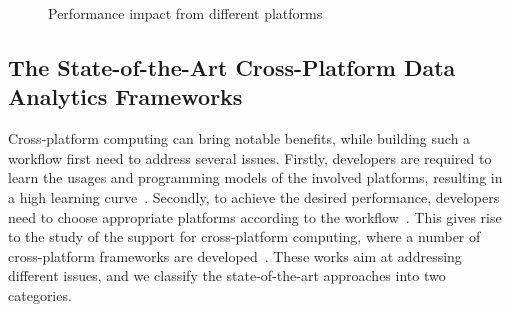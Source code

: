 \begin{figure}
  \centering
  
  \caption{Performance impact from different platforms}
  \label{fig:hetero}
\end{figure}

\subsection{The State-of-the-Art Cross-Platform Data Analytics Frameworks}

Cross-platform computing can bring notable benefits, while building such a workflow first need to address several issues. Firstly, developers are required to learn the usages and programming models of the involved platforms, resulting in a high learning curve~\cite{gadepally2016bigdawg}. Secondly, to achieve the desired performance, developers need to choose appropriate platforms according to the workflow~\cite{agrawal2016rheem,hutchison2017laradb,gog2015musketeer}.
This gives rise to the study of the support for cross-platform computing, where a number of cross-platform frameworks are developed~\cite{tsoumakos2013case, tan2017enabling, lu2019multi,gittens2018accelerating}.
These works aim at addressing different issues, and we classify the state-of-the-art approaches into two categories.

